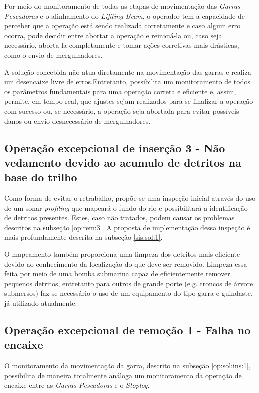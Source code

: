 Por meio do monitoramento de todas as etapas de movimentação das \emph{Garras
Pescadoras} e o alinhamento do \emph{Lifiting Beam}, o operador tem a capacidade
de perceber que a operação está sendo realizada corretamente e caso algum erro
ocorra, pode decidir entre abortar a operação e reiniciá-la ou, caso seja
necessário, aborta-la completamente e tomar ações corretivas mais drásticas,
como o envio de mergulhadores.

A solução concebida não atua diretamente na movimentação das garras e realiza um
desencaixe livre de erros.Entretanto, possibilita um monitoramento de todos os
parâmetros fundamentais para uma operação correta e eficiente e, assim,  
permite, em tempo real, que ajustes sejam realizados para se finalizar a
operação com sucesso ou, se necessário,  a operação seja abortada para evitar
possíveis danos ou envio desnecessário de mergulhadores.

\subsection{Operação excepcional de inserção 3 - Não vedamento devido ao acumulo de detritos na base do trilho}

Como forma de evitar o retrabalho, propõe-se uma inspeção inicial através do uso
de um sonar \emph{profiling} que mapeará o fundo do rio e possibilitará a
identificação de detritos presentes. Estes, caso não tratados, podem causar
os problemas descritos na subseção \ref{op:rem:3}. A proposta de implementação
dessa inspeção é mais profundamente descrita na subseção \ref{sis:sol:1}.

O mapeamento também proporciona uma limpeza dos detritos mais eficiente devido
ao conhecimento da localização do que deve ser removido. Limpeza essa feita
por meio de uma bomba submarina capaz de eficientemente remover pequenos
detritos, entretanto para outros de grande porte (e.g. troncos de árvore
submersos) faz-se necessário o uso de um equipamento do tipo garra e guindaste,
já utilizado atualmente.



\subsection{Operação excepcional de remoção 1 - Falha no encaixe}

O monitoramento da movimentação da garra, descrito na subseção
\ref{op:sol:ins:1}, possibilita de maneira totalmente análoga um monitoramento
da operação de encaixe entre as \emph{Garras Pescadoras} e o \emph{Stoplog}.

